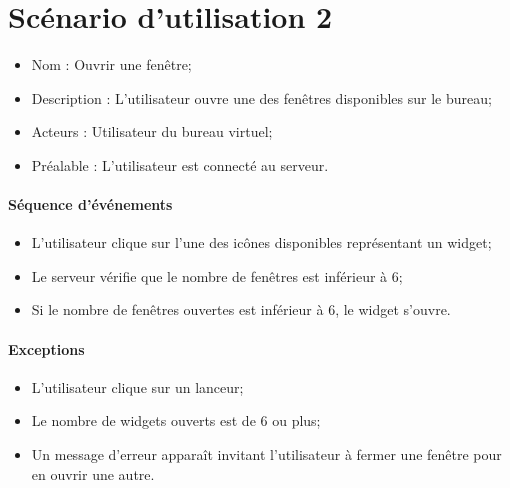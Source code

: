 
\section{Scénario d'utilisation 2}
\begin{itemize}
	\item Nom : Ouvrir une fenêtre;
	\item Description : L'utilisateur ouvre une des fenêtres disponibles sur le bureau;
	\item Acteurs : Utilisateur du bureau virtuel;
	\item Préalable : L'utilisateur est connecté au serveur.
\end{itemize}

\paragraph{Séquence d'événements}
\begin{itemize}
	\item L'utilisateur clique sur l'une des icônes disponibles représentant un widget;
	\item Le serveur vérifie que le nombre de fenêtres est inférieur à 6;
	\item Si le nombre de fenêtres ouvertes est inférieur à 6, le widget s'ouvre.
\end{itemize}

\paragraph{Exceptions}
\begin{itemize}
	\item L'utilisateur clique sur un lanceur;
	\item Le nombre de widgets ouverts est de 6 ou plus;
	\item Un message d'erreur apparaît invitant l'utilisateur à fermer une fenêtre pour en ouvrir une autre.
\end{itemize}

